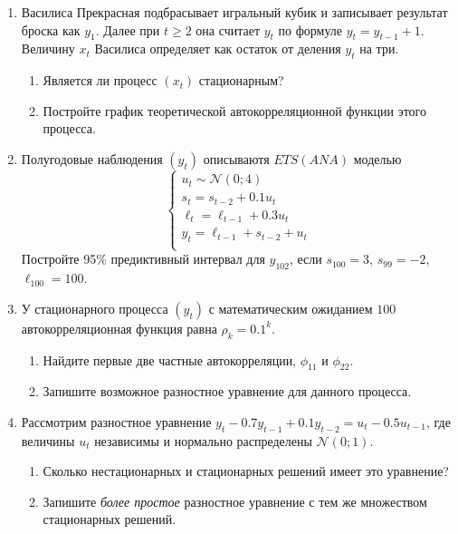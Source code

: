 \documentclass[12pt]{article}
\newcommand \cN{\mathcal{N}}
\begin{document}

\begin{enumerate}

\item Василиса Прекрасная подбрасывает игральный кубик и записывает результат броска как $y_1$.
Далее при $t \geq 2$ она считает $y_t$ по формуле $y_t = y_{t-1} + 1$. 
Величину $x_t$ Василиса определяет как остаток от деления $y_t$ на три. 

\begin{enumerate}
    \item Является ли процесс $(x_t)$ стационарным?
    \item Постройте график теоретической автокорреляционной функции этого процесса. 
\end{enumerate}


\item Полугодовые наблюдения $(y_t)$ описываютя $ETS(ANA)$ моделью
\[
\begin{cases}
    u_t \sim \cN(0; 4) \\
    s_t = s_{t-2} + 0.1 u_t \\
    \ell_t = \ell_{t-1} + 0.3 u_t \\
    y_t = \ell_{t-1} + s_{t-2} + u_t \\
\end{cases}    
\]
Постройте 95\% предиктивный интервал для $y_{102}$, если $s_{100} = 3$, $s_{99} = -2$, $\ell_{100} = 100$.

    \item У стационарного процесса $(y_t)$ с математическим ожиданием $100$ автокорреляционная функция равна $\rho_k = 0.1^k$.
  \begin{enumerate}
    \item Найдите первые две частные автокорреляции, $\phi_{11}$ и $\phi_{22}$.
    \item Запишите возможное разностное уравнение для данного процесса. 
  \end{enumerate}
  
\item Рассмотрим разностное уравнение $y_t - 0.7y_{t-1} + 0.1y_{t-2} = u_t - 0.5u_{t-1}$, где величины $u_t$ независимы и нормально распределены $\cN(0;1)$.
\begin{enumerate}
    \item Сколько нестационарных и стационарных решений имеет это уравнение?
    \item Запишите \textit{более простое} разностное уравнение с тем же множеством стационарных решений. 
\end{enumerate}


\end{enumerate}
\end{document}
